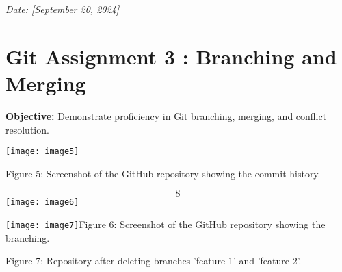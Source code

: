\documentclass{article} %
\begin{document}
\noindent \textit{Date: [September 20, 2024]}

\noindent \textit{}

\noindent 
\section{Git Assignment 3 : Branching and Merging}

\noindent \textbf{Objective: }Demonstrate proficiency in Git branching, merging, and conflict resolution.

\noindent 

\noindent \texttt{[image: image5]}

\noindent 

\noindent 

\noindent Figure 5: Screenshot of the GitHub repository showing the commit history.

\noindent 

\noindent 

\noindent 

\noindent 

\noindent 

\noindent 

\noindent 

\noindent 

\noindent 

\noindent 

\noindent 

\noindent 

\noindent 

\noindent 

\noindent 

\noindent 

\noindent 

\noindent 
\[8\] 
\texttt{[image: image6]}

\noindent 

\noindent 

\noindent \texttt{[image: image7]}Figure 6: Screenshot of the GitHub repository showing the branching.

\noindent 

\noindent Figure 7: Repository after deleting branches 'feature-1' and 'feature-2'.

\noindent 

\noindent 

\noindent 

\noindent 
\end{document}
